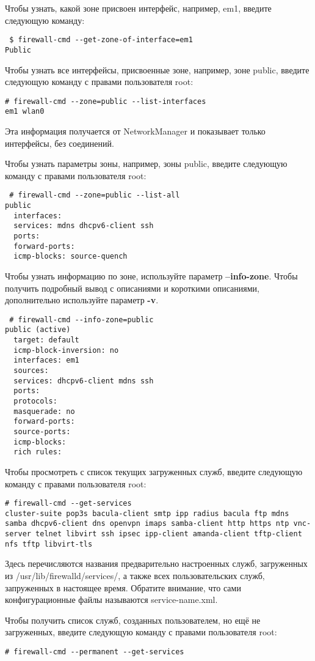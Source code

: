 \documentclass[a4paper,10pt,twoside]{article}
\begin{document}
Чтобы узнать, какой зоне присвоен интерфейс, например, em1, введите следующую команду:
\begin{verbatim}
 $ firewall-cmd --get-zone-of-interface=em1
Public
\end{verbatim} 

Чтобы узнать все интерфейсы, присвоенные зоне, например, зоне public, введите следующую команду с правами пользователя root: 
\begin{verbatim}
# firewall-cmd --zone=public --list-interfaces
em1 wlan0
\end{verbatim} 
Эта информация получается от NetworkManager и показывает только интерфейсы, без соединений.


Чтобы узнать параметры зоны, например, зоны public, введите следующую команду с правами пользователя root: 
\begin{verbatim}
 # firewall-cmd --zone=public --list-all
public
  interfaces: 
  services: mdns dhcpv6-client ssh
  ports: 
  forward-ports: 
  icmp-blocks: source-quench
\end{verbatim} 

Чтобы узнать информацию по зоне, используйте параметр \textbf{--info-zone}. Чтобы получить подробный вывод с описаниями и короткими описаниями, дополнительно используйте параметр \textbf{-v}.
\begin{verbatim}
 # firewall-cmd --info-zone=public
public (active)
  target: default
  icmp-block-inversion: no
  interfaces: em1
  sources: 
  services: dhcpv6-client mdns ssh
  ports: 
  protocols: 
  masquerade: no
  forward-ports: 
  source-ports: 
  icmp-blocks: 
  rich rules:
\end{verbatim} 

Чтобы просмотреть с список текущих загруженных служб, введите следующую команду с правами пользователя root: 
\begin{verbatim}
# firewall-cmd --get-services
cluster-suite pop3s bacula-client smtp ipp radius bacula ftp mdns samba dhcpv6-client dns openvpn imaps samba-client http https ntp vnc-server telnet libvirt ssh ipsec ipp-client amanda-client tftp-client nfs tftp libvirt-tls
\end{verbatim} 

Здесь перечисляются названия предварительно настроенных служб, загруженных из /usr/lib/firewalld/services/, а также всех пользовательских служб, запруженных в настоящее время. Обратите внимание, что сами конфигурационные файлы называются service-name.xml.

Чтобы получить список служб, созданных пользователем, но ещё не загруженных, введите следующую команду с правами пользователя root: 
\begin{verbatim}
# firewall-cmd --permanent --get-services
\end{verbatim} 
\end{document}
